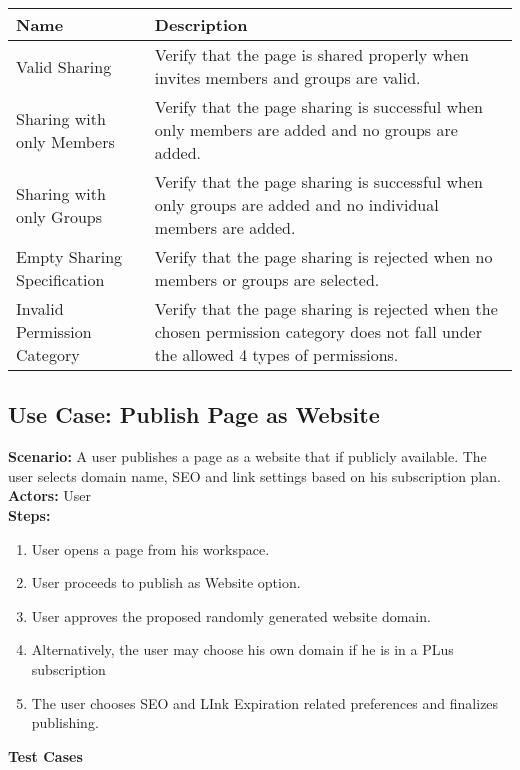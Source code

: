 \documentclass{article}
\begin{document}
            \begin{longtable}{|p{}|p{}|}
            \hline
            \textbf{Name} & \textbf{Description} \\
            \hline
            Valid Sharing & Verify that the page is shared properly when invites members and groups are valid. \\
\hline
Sharing with only Members & Verify that the page sharing is successful when only members are added and no groups are added. \\
\hline
Sharing with only Groups & Verify that the page sharing is successful when only groups are added and no individual members are added. \\
\hline
Empty Sharing Specification & Verify that the page sharing is rejected when no members or groups are selected. \\
\hline
Invalid Permission Category & Verify that the page sharing is rejected when the chosen permission category does not fall under the allowed 4 types of permissions. \\
\hline
\end{longtable}\subsection{\textbf{Use Case: Publish Page as Website}}
\textbf{Scenario:} A user publishes a page as a website that if publicly available. The user selects domain name, SEO and link settings based on his subscription plan.\\
\textbf{Actors:} User\\
\textbf{Steps:}
\begin{enumerate}
\item User opens a page from his workspace.
\item User proceeds to publish as Website option.
\item User approves the proposed randomly generated website domain.
\item Alternatively, the user may choose his own domain if he is in a PLus subscription
\item The user chooses SEO and LInk Expiration related preferences and finalizes publishing.
\end{enumerate}
\textbf{Test Cases}
\end{document}
